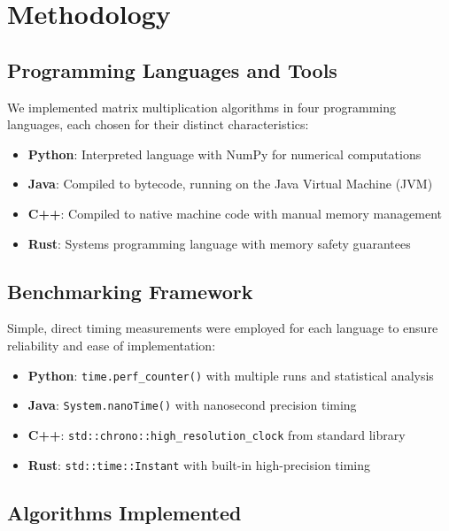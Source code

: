 \documentclass[11pt,a4paper]{article}
\begin{document}
\section{Methodology}

\subsection{Programming Languages and Tools}

We implemented matrix multiplication algorithms in four programming languages, each chosen for their distinct characteristics:

\begin{itemize}
    \item \textbf{Python}: Interpreted language with NumPy for numerical computations
    \item \textbf{Java}: Compiled to bytecode, running on the Java Virtual Machine (JVM)
    \item \textbf{C++}: Compiled to native machine code with manual memory management
    \item \textbf{Rust}: Systems programming language with memory safety guarantees
\end{itemize}

\subsection{Benchmarking Framework}

Simple, direct timing measurements were employed for each language to ensure reliability and ease of implementation:

\begin{itemize}
    \item \textbf{Python}: \texttt{time.perf\_counter()} with multiple runs and statistical analysis
    \item \textbf{Java}: \texttt{System.nanoTime()} with nanosecond precision timing
    \item \textbf{C++}: \texttt{std::chrono::high\_resolution\_clock} from standard library
    \item \textbf{Rust}: \texttt{std::time::Instant} with built-in high-precision timing
\end{itemize}

\subsection{Algorithms Implemented}
\end{document}
